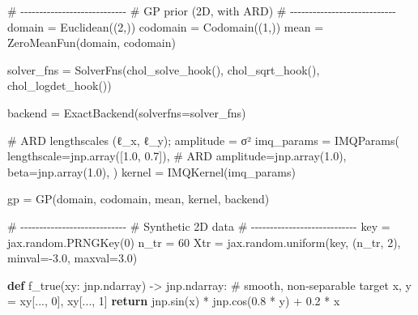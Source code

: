 \documentclass[
  letterpaper,
  DIV=11,
  numbers=noendperiod]{scrartcl}
\newenvironment{Shaded}{\begin{snugshade}}{\end{snugshade}}
\newcommand{\CommentTok}[1]{\textcolor[rgb]{0.37,0.37,0.37}{#1}}
\newcommand{\ControlFlowTok}[1]{\textcolor[rgb]{0.00,0.23,0.31}{\textbf{#1}}}
\newcommand{\DecValTok}[1]{\textcolor[rgb]{0.68,0.00,0.00}{#1}}
\newcommand{\FloatTok}[1]{\textcolor[rgb]{0.68,0.00,0.00}{#1}}
\newcommand{\KeywordTok}[1]{\textcolor[rgb]{0.00,0.23,0.31}{\textbf{#1}}}
\newcommand{\NormalTok}[1]{\textcolor[rgb]{0.00,0.23,0.31}{#1}}
\newcommand{\OperatorTok}[1]{\textcolor[rgb]{0.37,0.37,0.37}{#1}}
\begin{document}
\begin{Shaded}
\begin{Highlighting}[]
\CommentTok{\# {-}{-}{-}{-}{-}{-}{-}{-}{-}{-}{-}{-}{-}{-}{-}{-}{-}{-}{-}{-}{-}{-}{-}{-}{-}{-}{-}{-}}
\CommentTok{\# GP prior (2D, with ARD)}
\CommentTok{\# {-}{-}{-}{-}{-}{-}{-}{-}{-}{-}{-}{-}{-}{-}{-}{-}{-}{-}{-}{-}{-}{-}{-}{-}{-}{-}{-}{-}}
\NormalTok{domain   }\OperatorTok{=}\NormalTok{ Euclidean((}\DecValTok{2}\NormalTok{,))}
\NormalTok{codomain }\OperatorTok{=}\NormalTok{ Codomain((}\DecValTok{1}\NormalTok{,))}
\NormalTok{mean     }\OperatorTok{=}\NormalTok{ ZeroMeanFun(domain, codomain)}

\NormalTok{solver\_fns }\OperatorTok{=}\NormalTok{ SolverFns(chol\_solve\_hook(), chol\_sqrt\_hook(), chol\_logdet\_hook())}

\NormalTok{backend }\OperatorTok{=}\NormalTok{ ExactBackend(solverfns}\OperatorTok{=}\NormalTok{solver\_fns)}

\CommentTok{\# ARD lengthscales (ℓ\_x, ℓ\_y); amplitude = σ²}
\NormalTok{imq\_params }\OperatorTok{=}\NormalTok{ IMQParams(}
\NormalTok{    lengthscale}\OperatorTok{=}\NormalTok{jnp.array([}\FloatTok{1.0}\NormalTok{, }\FloatTok{0.7}\NormalTok{]),  }\CommentTok{\# ARD}
\NormalTok{    amplitude}\OperatorTok{=}\NormalTok{jnp.array(}\FloatTok{1.0}\NormalTok{),}
\NormalTok{    beta}\OperatorTok{=}\NormalTok{jnp.array(}\FloatTok{1.0}\NormalTok{),}
\NormalTok{)}
\NormalTok{kernel  }\OperatorTok{=}\NormalTok{ IMQKernel(imq\_params)}

\NormalTok{gp      }\OperatorTok{=}\NormalTok{ GP(domain, codomain, mean, kernel, backend)}

\CommentTok{\# {-}{-}{-}{-}{-}{-}{-}{-}{-}{-}{-}{-}{-}{-}{-}{-}{-}{-}{-}{-}{-}{-}{-}{-}{-}{-}{-}{-}}
\CommentTok{\# Synthetic 2D data}
\CommentTok{\# {-}{-}{-}{-}{-}{-}{-}{-}{-}{-}{-}{-}{-}{-}{-}{-}{-}{-}{-}{-}{-}{-}{-}{-}{-}{-}{-}{-}}
\NormalTok{key }\OperatorTok{=}\NormalTok{ jax.random.PRNGKey(}\DecValTok{0}\NormalTok{)}
\NormalTok{n\_tr }\OperatorTok{=} \DecValTok{60}
\NormalTok{Xtr }\OperatorTok{=}\NormalTok{ jax.random.uniform(key, (n\_tr, }\DecValTok{2}\NormalTok{), minval}\OperatorTok{={-}}\FloatTok{3.0}\NormalTok{, maxval}\OperatorTok{=}\FloatTok{3.0}\NormalTok{)}

\KeywordTok{def}\NormalTok{ f\_true(xy: jnp.ndarray) }\OperatorTok{{-}\textgreater{}}\NormalTok{ jnp.ndarray:}
    \CommentTok{\# smooth, non{-}separable target}
\NormalTok{    x, y }\OperatorTok{=}\NormalTok{ xy[..., }\DecValTok{0}\NormalTok{], xy[..., }\DecValTok{1}\NormalTok{]}
    \ControlFlowTok{return}\NormalTok{ jnp.sin(x) }\OperatorTok{*}\NormalTok{ jnp.cos(}\FloatTok{0.8} \OperatorTok{*}\NormalTok{ y) }\OperatorTok{+} \FloatTok{0.2} \OperatorTok{*}\NormalTok{ x}


\end{Highlighting}
\end{Shaded}
\end{document}
